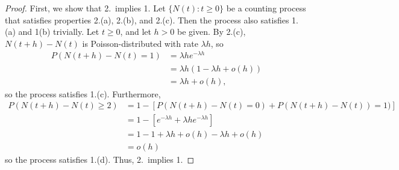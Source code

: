\documentclass{homework}
\begin{document}
	\begin{proof}
		First, we show that 2.\ implies 1. Let $\{N(t) : t \ge 0\}$ be a counting process that satisfies properties 2.(a), 2.(b), and 2.(c). Then the process also satisfies 1.(a) and 1(b) trivially. Let $t \ge 0$, and let $h > 0$ be given. By 2.(c), $N(t+h) - N(t)$ is Poisson-distributed with rate $\lambda h$, so
		\begin{align*}
			P(N(t+h) - N(t) = 1) &= \lambda h e^{-\lambda h} \\
			&= \lambda h\left(1 - \lambda h + o(h)\right) \\
			&= \lambda h + o(h),
		\end{align*}
		so the process satisfies 1.(c). Furthermore,
		\begin{align*}
			P(N(t+h)-N(t)\ge 2) &= 1 - \left[P(N(t+h)-N(t) = 0) + P(N(t+h) - N(t)) = 1)\right] \\
			&= 1 - \left[e^{-\lambda h} + \lambda he^{-\lambda h}\right]\\
			&= 1 - 1 + \lambda h + o(h) - \lambda h + o(h) \\
			&= o(h)
		\end{align*}
		so the process satisfies 1.(d). Thus, 2.\ implies 1.
		

\end{proof}
\end{document}

